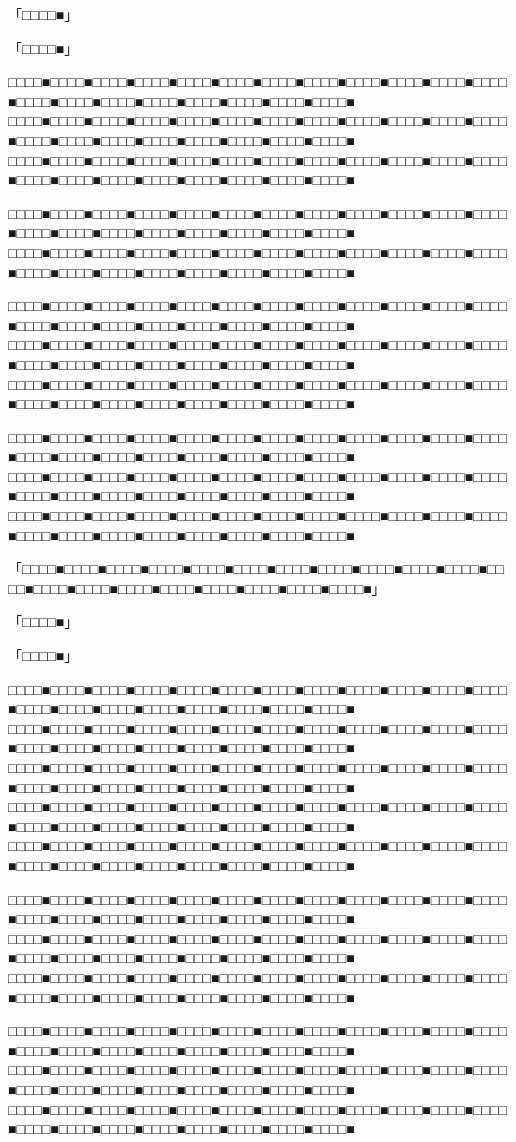 \documentclass[
tate,
book,
openany,
paper={202mm,270mm},
oneside,
fontsize=9pt, %
jafontsize=9pt, %
head_space=11truemm, %
gutter=8truemm, %
line_length=78zw, %
number_of_lines=35, %
column_gap=5truemm,%
headfoot_verticalposition=4truemm,%
draft
]{jlreq}
\begin{document}
\begin{multicols*}{3}
「□□□□■」

「□□□□■」

□□□□■□□□□■□□□□■□□□□■□□□□■□□□□■□□□□■□□□□■□□□□■□□□□■□□□□■□□□□■□□□□■□□□□■□□□□■□□□□■□□□□■□□□□■□□□□■□□□□■
□□□□■□□□□■□□□□■□□□□■□□□□■□□□□■□□□□■□□□□■□□□□■□□□□■□□□□■□□□□■□□□□■□□□□■□□□□■□□□□■□□□□■□□□□■□□□□■□□□□■
□□□□■□□□□■□□□□■□□□□■□□□□■□□□□■□□□□■□□□□■□□□□■□□□□■□□□□■□□□□■□□□□■□□□□■□□□□■□□□□■□□□□■□□□□■□□□□■□□□□■

□□□□■□□□□■□□□□■□□□□■□□□□■□□□□■□□□□■□□□□■□□□□■□□□□■□□□□■□□□□■□□□□■□□□□■□□□□■□□□□■□□□□■□□□□■□□□□■□□□□■
□□□□■□□□□■□□□□■□□□□■□□□□■□□□□■□□□□■□□□□■□□□□■□□□□■□□□□■□□□□■□□□□■□□□□■□□□□■□□□□■□□□□■□□□□■□□□□■□□□□■

□□□□■□□□□■□□□□■□□□□■□□□□■□□□□■□□□□■□□□□■□□□□■□□□□■□□□□■□□□□■□□□□■□□□□■□□□□■□□□□■□□□□■□□□□■□□□□■□□□□■
□□□□■□□□□■□□□□■□□□□■□□□□■□□□□■□□□□■□□□□■□□□□■□□□□■□□□□■□□□□■□□□□■□□□□■□□□□■□□□□■□□□□■□□□□■□□□□■□□□□■
□□□□■□□□□■□□□□■□□□□■□□□□■□□□□■□□□□■□□□□■□□□□■□□□□■□□□□■□□□□■□□□□■□□□□■□□□□■□□□□■□□□□■□□□□■□□□□■□□□□■

□□□□■□□□□■□□□□■□□□□■□□□□■□□□□■□□□□■□□□□■□□□□■□□□□■□□□□■□□□□■□□□□■□□□□■□□□□■□□□□■□□□□■□□□□■□□□□■□□□□■
□□□□■□□□□■□□□□■□□□□■□□□□■□□□□■□□□□■□□□□■□□□□■□□□□■□□□□■□□□□■□□□□■□□□□■□□□□■□□□□■□□□□■□□□□■□□□□■□□□□■
□□□□■□□□□■□□□□■□□□□■□□□□■□□□□■□□□□■□□□□■□□□□■□□□□■□□□□■□□□□■□□□□■□□□□■□□□□■□□□□■□□□□■□□□□■□□□□■□□□□■

「□□□□■□□□□■□□□□■□□□□■□□□□■□□□□■□□□□■□□□□■□□□□■□□□□■□□□□■□□□□■□□□□■□□□□■□□□□■□□□□■□□□□■□□□□■□□□□■□□□□■」

「□□□□■」

「□□□□■」

□□□□■□□□□■□□□□■□□□□■□□□□■□□□□■□□□□■□□□□■□□□□■□□□□■□□□□■□□□□■□□□□■□□□□■□□□□■□□□□■□□□□■□□□□■□□□□■□□□□■
□□□□■□□□□■□□□□■□□□□■□□□□■□□□□■□□□□■□□□□■□□□□■□□□□■□□□□■□□□□■□□□□■□□□□■□□□□■□□□□■□□□□■□□□□■□□□□■□□□□■
□□□□■□□□□■□□□□■□□□□■□□□□■□□□□■□□□□■□□□□■□□□□■□□□□■□□□□■□□□□■□□□□■□□□□■□□□□■□□□□■□□□□■□□□□■□□□□■□□□□■
□□□□■□□□□■□□□□■□□□□■□□□□■□□□□■□□□□■□□□□■□□□□■□□□□■□□□□■□□□□■□□□□■□□□□■□□□□■□□□□■□□□□■□□□□■□□□□■□□□□■
□□□□■□□□□■□□□□■□□□□■□□□□■□□□□■□□□□■□□□□■□□□□■□□□□■□□□□■□□□□■□□□□■□□□□■□□□□■□□□□■□□□□■□□□□■□□□□■□□□□■

□□□□■□□□□■□□□□■□□□□■□□□□■□□□□■□□□□■□□□□■□□□□■□□□□■□□□□■□□□□■□□□□■□□□□■□□□□■□□□□■□□□□■□□□□■□□□□■□□□□■
□□□□■□□□□■□□□□■□□□□■□□□□■□□□□■□□□□■□□□□■□□□□■□□□□■□□□□■□□□□■□□□□■□□□□■□□□□■□□□□■□□□□■□□□□■□□□□■□□□□■
□□□□■□□□□■□□□□■□□□□■□□□□■□□□□■□□□□■□□□□■□□□□■□□□□■□□□□■□□□□■□□□□■□□□□■□□□□■□□□□■□□□□■□□□□■□□□□■□□□□■

□□□□■□□□□■□□□□■□□□□■□□□□■□□□□■□□□□■□□□□■□□□□■□□□□■□□□□■□□□□■□□□□■□□□□■□□□□■□□□□■□□□□■□□□□■□□□□■□□□□■
□□□□■□□□□■□□□□■□□□□■□□□□■□□□□■□□□□■□□□□■□□□□■□□□□■□□□□■□□□□■□□□□■□□□□■□□□□■□□□□■□□□□■□□□□■□□□□■□□□□■
□□□□■□□□□■□□□□■□□□□■□□□□■□□□□■□□□□■□□□□■□□□□■□□□□■□□□□■□□□□■□□□□■□□□□■□□□□■□□□□■□□□□■□□□□■□□□□■□□□□■


\end{multicols*}
\end{document}
